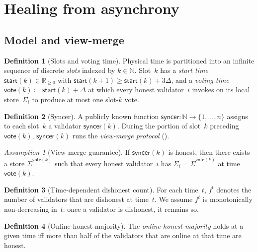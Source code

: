\ifx\litemode\undefined\documentclass{article}\fi
\newcommand{\syncer}{\mathsf{syncer}}
\newcommand{\start}{\mathsf{start}}
\newcommand{\vote}{\mathsf{vote}}
\newcommand{\comm}[1]{\bar{#1}}
\theoremstyle{plain}
\theoremstyle{definition}
\newtheorem{definition}{Definition}
\theoremstyle{remark}
\newtheorem{assumption}{Assumption}
\newcommand{\OHM}{online-honest majority\xspace}
\begin{document}
\section{Healing from asynchrony}\label{sec:healing}

\subsection{Model and view-merge}\label{rev:sec:healing-model}

\begin{definition}[Slots and voting time]\label{rev:def:slots}
Physical time is partitioned into an infinite sequence of discrete \emph{slots} indexed by $k \in \mathbb{N}$.
Slot~$k$ has a \emph{start time} $\start(k) \in \mathbb{R}_{\geq 0}$ with $\start(k+1) \geq \start(k) + 3\Delta$, and a \emph{voting time} $\vote(k) \coloneqq \start(k) + \Delta$ at which every honest validator~$i$ invokes  on its local store~$\Sigma_i$ to produce at most one slot-$k$ vote.
\end{definition}

\begin{definition}[Syncer]\label{rev:def:syncer}
A publicly known function $\syncer \colon \mathbb{N} \to \{1, \ldots, n\}$ assigns to each slot~$k$ a validator $\syncer(k)$.
During the portion of slot~$k$ preceding $\vote(k)$, $\syncer(k)$ runs the \emph{view-merge protocol} ().
\end{definition}

\begin{assumption}[View-merge guarantee]\label{rev:ass:view-merge}
If $\syncer(k)$ is honest, then there exists a store $\comm{\Sigma}^{\vote(k)}$ such that every honest validator~$i$ has $\Sigma_i = \comm{\Sigma}^{\vote(k)}$ at time $\vote(k)$.
\end{assumption}

\begin{definition}[Time-dependent dishonest count]\label{rev:def:f-t}
For each time~$t$, $f^t$ denotes the number of validators that are dishonest at time~$t$. We assume $f^t$ is monotonically non-decreasing in~$t$: once a validator is dishonest, it remains so.
\end{definition}

\begin{definition}[Online-honest majority]\label{rev:def:online-honest-majority}
The \emph{\OHM} holds at a given time iff more than half of the validators that are online at that time are honest.
\end{definition}
\end{document}
